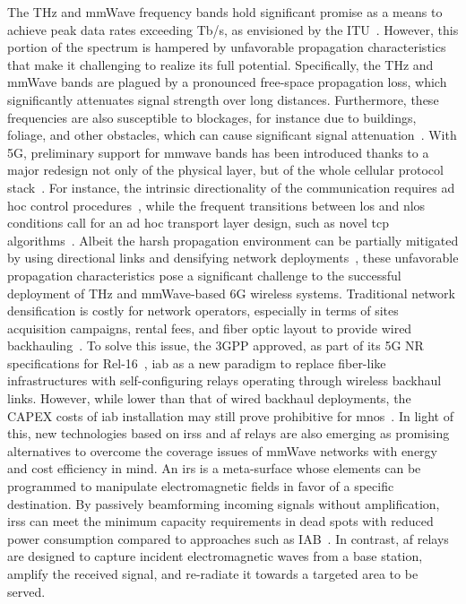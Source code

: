 The THz and mmWave frequency bands hold significant promise as a means to achieve peak data rates exceeding Tb/s, as envisioned by the ITU~\cite{imt2030}. However, this portion of the spectrum is hampered by unfavorable propagation characteristics that make it challenging to realize its full potential.
Specifically, the THz and mmWave bands are plagued by a pronounced free-space propagation loss, which significantly attenuates signal strength over long distances. Furthermore, these frequencies are also susceptible to blockages, for instance due to buildings, foliage, and other obstacles, which can cause significant signal attenuation~\cite{han2018propagation, jornet2011channel}.
With 5G, preliminary support for \gls{mmwave} bands has been introduced thanks to a major redesign not only of the physical layer, but of the whole cellular protocol stack~\cite{shafi2018microwave}. For instance, the intrinsic directionality of the communication requires ad hoc control procedures~\cite{heng2021six}, while the frequent transitions between \gls{los} and \gls{nlos} conditions call for an ad hoc transport layer design, such as novel \gls{tcp} algorithms~\cite{zhang2019will}. 
Albeit the harsh propagation environment can be partially mitigated by using directional links and densifying network deployments~\cite{polese2020toward}, these unfavorable propagation characteristics pose a significant challenge to the successful deployment of THz and mmWave-based 6G wireless systems. Traditional network densification is costly for network operators,
especially in terms of sites acquisition campaigns, rental fees, and fiber optic layout to provide wired backhauling~\cite{lopez2015towards}.
To solve this issue, the 3GPP approved, as part of its 5G NR specifications for Rel-16~\cite{3gpp_38_874}, \gls{iab} as a new paradigm to replace fiber-like infrastructures with self-configuring relays operating through wireless backhaul links. 
However, while lower than that of wired backhaul deployments, the CAPEX costs of \gls{iab} installation may still prove prohibitive for \glspl{mno}~\cite{chaoub20216g}.
In light of this, new technologies based on \glspl{irs} and \gls{af} relays are also emerging as promising alternatives to overcome the coverage issues of mmWave networks with energy and cost efficiency in mind.
An \gls{irs} is a meta-surface whose elements can be programmed to manipulate electromagnetic fields in favor of a specific destination. By passively beamforming incoming signals without amplification, \glspl{irs} can meet the minimum capacity requirements in dead spots with reduced power consumption compared to approaches such as IAB~\cite{bjornson2019intelligent}. In contrast, \gls{af} relays are designed to capture incident electromagnetic waves from a base station, amplify the received signal, and re-radiate it towards a targeted area to be served.
